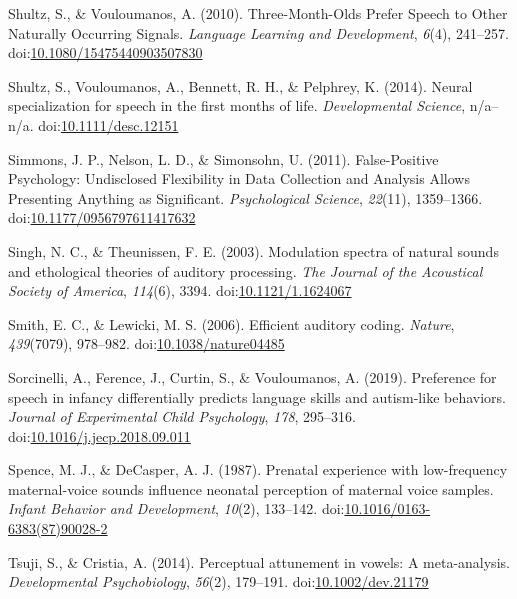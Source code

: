 \documentclass[man]{apa6}
\begin{document}
\hypertarget{ref-shultz_three-month-olds_2010}{}
Shultz, S., \& Vouloumanos, A. (2010). Three-Month-Olds Prefer Speech to
Other Naturally Occurring Signals. \emph{Language Learning and
Development}, \emph{6}(4), 241--257.
doi:\href{https://doi.org/10.1080/15475440903507830}{10.1080/15475440903507830}

\hypertarget{ref-shultz_neural_2014}{}
Shultz, S., Vouloumanos, A., Bennett, R. H., \& Pelphrey, K. (2014).
Neural specialization for speech in the first months of life.
\emph{Developmental Science}, n/a--n/a.
doi:\href{https://doi.org/10.1111/desc.12151}{10.1111/desc.12151}

\hypertarget{ref-simmons_false-positive_2011}{}
Simmons, J. P., Nelson, L. D., \& Simonsohn, U. (2011). False-Positive
Psychology: Undisclosed Flexibility in Data Collection and Analysis
Allows Presenting Anything as Significant. \emph{Psychological Science},
\emph{22}(11), 1359--1366.
doi:\href{https://doi.org/10.1177/0956797611417632}{10.1177/0956797611417632}

\hypertarget{ref-singh_modulation_2003}{}
Singh, N. C., \& Theunissen, F. E. (2003). Modulation spectra of natural
sounds and ethological theories of auditory processing. \emph{The
Journal of the Acoustical Society of America}, \emph{114}(6), 3394.
doi:\href{https://doi.org/10.1121/1.1624067}{10.1121/1.1624067}

\hypertarget{ref-smith_efficient_2006}{}
Smith, E. C., \& Lewicki, M. S. (2006). Efficient auditory coding.
\emph{Nature}, \emph{439}(7079), 978--982.
doi:\href{https://doi.org/10.1038/nature04485}{10.1038/nature04485}

\hypertarget{ref-sorcinelli_preference_2019}{}
Sorcinelli, A., Ference, J., Curtin, S., \& Vouloumanos, A. (2019).
Preference for speech in infancy differentially predicts language skills
and autism-like behaviors. \emph{Journal of Experimental Child
Psychology}, \emph{178}, 295--316.
doi:\href{https://doi.org/10.1016/j.jecp.2018.09.011}{10.1016/j.jecp.2018.09.011}

\hypertarget{ref-spence_prenatal_1987}{}
Spence, M. J., \& DeCasper, A. J. (1987). Prenatal experience with
low-frequency maternal-voice sounds influence neonatal perception of
maternal voice samples. \emph{Infant Behavior and Development},
\emph{10}(2), 133--142.
doi:\href{https://doi.org/10.1016/0163-6383(87)90028-2}{10.1016/0163-6383(87)90028-2}

\hypertarget{ref-tsuji_perceptual_2014}{}
Tsuji, S., \& Cristia, A. (2014). Perceptual attunement in vowels: A
meta-analysis. \emph{Developmental Psychobiology}, \emph{56}(2),
179--191.
doi:\href{https://doi.org/10.1002/dev.21179}{10.1002/dev.21179}
\end{document}
